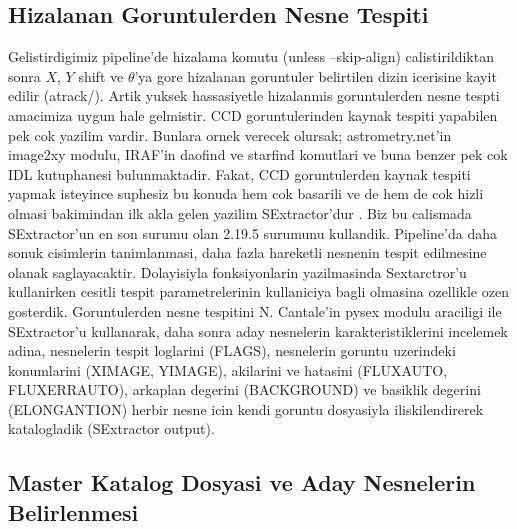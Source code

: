 \documentclass[review]{elsarticle}
\begin{document}
\subsection{Hizalanan Goruntulerden Nesne Tespiti}

Gelistirdigimiz pipeline'de hizalama komutu (unless --skip-align) calistirildiktan sonra $X$, $Y$ shift ve $\theta$'ya gore hizalanan goruntuler belirtilen dizin icerisine kayit edilir (atrack/). Artik yuksek hassasiyetle hizalanmis goruntulerden nesne tespti amacimiza uygun hale gelmistir. CCD goruntulerinden kaynak tespiti yapabilen pek cok yazilim vardir. Bunlara ornek verecek olursak; astrometry.net’in image2xy modulu, IRAF’in daofind ve starfind komutlari ve buna benzer pek cok IDL kutuphanesi bulunmaktadir. Fakat, CCD goruntulerden kaynak tespiti yapmak isteyince suphesiz bu konuda hem cok basarili ve de hem de cok hizli olmasi bakimindan ilk akla gelen yazilim SExtractor’dur \citep{bertin1996}. Biz bu calismada SExtractor’un en son surumu olan 2.19.5 surumunu kullandik. Pipeline’da daha sonuk cisimlerin tanimlanmasi, daha fazla hareketli nesnenin tespit edilmesine olanak saglayacaktir. Dolayisiyla fonksiyonlarin yazilmasinda Sextarctror’u kullanirken cesitli tespit parametrelerinin kullaniciya bagli olmasina ozellikle ozen gosterdik. Goruntulerden nesne tespitini N. Cantale’in pysex modulu araciligi ile SExtractor’u kullanarak, daha sonra aday nesnelerin karakteristiklerini incelemek adina, nesnelerin tespit loglarini (FLAGS), nesnelerin goruntu uzerindeki konumlarini (XIMAGE, YIMAGE), akilarini ve hatasini (FLUXAUTO, FLUXERRAUTO), arkaplan degerini (BACKGROUND) ve basiklik degerini (ELONGANTION) herbir nesne icin kendi goruntu dosyasiyla iliskilendirerek katalogladik (SExtractor output).

\subsection{Master Katalog Dosyasi ve Aday Nesnelerin Belirlenmesi} \label{sec:hnak}
\end{document}
